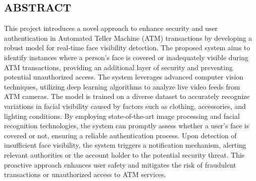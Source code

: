 
\begin{center}
    \section*{ABSTRACT}
\end{center}

\noindent
This project introduces a novel approach to enhance security and user authentication in Automated Teller Machine (ATM) transactions by developing a robust model for real-time face visibility detection. The proposed system aims to identify instances where a person's face is covered or inadequately visible during ATM transactions, providing an additional layer of security and preventing potential unauthorized access.
\newline
\newline
The system leverages advanced computer vision techniques, utilizing deep learning algorithms to analyze live video feeds from ATM cameras. The model is trained on a diverse dataset to accurately recognize variations in facial visibility caused by factors such as clothing, accessories, and lighting conditions. By employing state-of-the-art image processing and facial recognition technologies, the system can promptly assess whether a user's face is covered or not, ensuring a reliable authentication process.
\newline
\newline
Upon detection of insufficient face visibility, the system triggers a notification mechanism, alerting relevant authorities or the account holder to the potential security threat. This proactive approach enhances user safety and mitigates the risk of fraudulent transactions or unauthorized access to ATM services.
